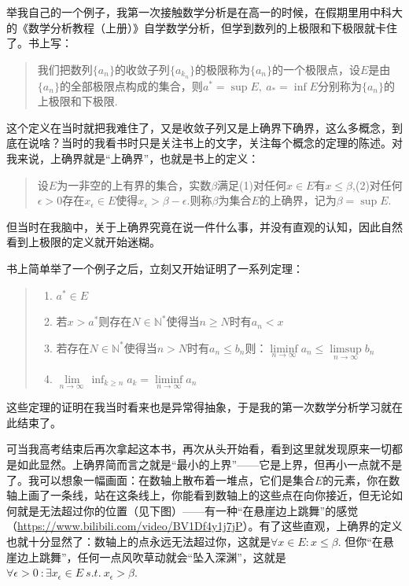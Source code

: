 \documentclass{ctexart}
\begin{document}
\begin{myexample}
  举我自己的一个例子，我第一次接触数学分析是在高一的时候，在假期里用中科大的《数学分析教程（上册）》自学数学分析，但学到数列的上极限和下极限就卡住了。书上写：
  
  \begin{quote}
    我们把数列$\{ a_{n}\}$的收敛子列$\{ a_{k_{n}}\}$的极限称为$\{ a_{n}\}$的一个极限点，设$E$是由$\{ a_{n}\}$的全部极限点构成的集合，则$a^{*} = \sup E,\ a_{*} = \inf E$分别称为$\{ a_{n}\}$的上极限和下极限.
  \end{quote}
  
  这个定义在当时就把我难住了，又是收敛子列又是上确界下确界，这么多概念，到底在说啥？当时的我看书时只是关注书上的文字，关注每个概念的定理的陈述。对我来说，上确界就是“上确界”，也就是书上的定义：
  
  \begin{quote}
    设$E$为一非空的上有界的集合，实数$\beta$满足(1)对任何$x \in E$有$x \leq \beta$,(2)对任何$\epsilon > 0$存在$x_{\epsilon} \in E$使得$x_{\epsilon} > \beta - \epsilon$.则称$\beta$为集合$E$的上确界，记为$\beta = \sup E.$
  \end{quote}
  
  但当时在我脑中，关于上确界究竟在说一件什么事，并没有直观的认知，因此自然看到上极限的定义就开始迷糊。
  
  书上简单举了一个例子之后，立刻又开始证明了一系列定理：
  
  \begin{quote}
    \begin{enumerate}[leftmargin=*, labelsep=0.5em]
    \item $a^{*} \in E$
    \item 若$x > a^{*}$则存在$N \in \mathbb{N}^{*}$使得当$n \geq N$时有$a_{n} < x$
    \item 若存在$N \in \mathbb{N}^{*}$使得当$n > N$时有$a_{n} \leq b_{n}$则：$\liminf\limits_{n \rightarrow \infty} a_{n} \leq \limsup\limits_{n \rightarrow \infty} b_{n}$
    \item $\lim\limits_{n \rightarrow \infty\ }{\inf_{k \geq n}a_{k}} = \liminf\limits_{n \rightarrow \infty}a_{n}$
  \end{enumerate}
  \end{quote}
  
  这些定理的证明在我当时看来也是异常得抽象，于是我的第一次数学分析学习就在此结束了。
  
  可当我高考结束后再次拿起这本书，再次从头开始看，看到这里就发现原来一切都是如此显然。上确界简而言之就是“最小的上界”——它是上界，但再小一点就不是了。我可以想象一幅画面：在数轴上散布着一堆点，它们是集合$E$的元素，你在数轴上画了一条线，站在这条线上，你能看到数轴上的这些点在向你接近，但无论如何就是无法超过你的位置（见下图）——有一种“在悬崖边上跳舞”的感觉（\url{https://www.bilibili.com/video/BV1Df4y1j7jP}）。有了这些直观，上确界的定义也就十分显然了：数轴上的点永远无法超过你，这就是$\forall x \in E:x \leq \beta$.
  但你“在悬崖边上跳舞”，任何一点风吹草动就会“坠入深渊”，这就是$\forall\epsilon > 0\ :\exists x_{\epsilon} \in E\ s.t.\ x_{\epsilon} > \beta$.
  

\end{myexample}
\end{document}
